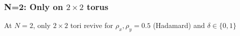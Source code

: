 \subsubsection{N=2: Only on $2 \times 2$ torus}
At $N=2$, only $2 \times 2$ tori revive for $\rho_x, \rho_y = 0.5$
(Hadamard) and $\delta \in \{0,1\}$
